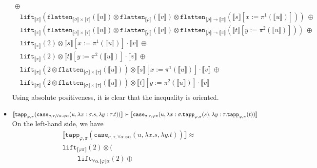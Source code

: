 \documentclass[a4paper,UKenglish,cleveref,autoref,numberwithinsect]{lipics-v2019}
\theoremstyle{definition}
\newcommand{\arrtype}{\rightarrow}
\newcommand{\quant}[2]{\forall #1.#2}
\newcommand{\abs}[2]{\lambda #1.#2}
\newcommand{\flatten}{\mathtt{flatten}}
\newcommand{\lift}{\mathtt{lift}}
\newcommand{\typeinterpret}[1]{\llbracket #1 \rrbracket}
\newcommand{\interpret}[1]{\llbracket #1 \rrbracket}
\begin{document}
\begin{itemize}
\[\begin{array}{l}
    \oplus \\
  \phantom{A}
  \lift_{\typeinterpret{\pi}}(\flatten_{\typeinterpret{\sigma} \times
    \typeinterpret{\tau}}(\interpret{u}) \otimes
    \flatten_{\typeinterpret{\rho}}(\interpret{v}) \otimes
    \flatten_{\typeinterpret{\rho} \arrtype \typeinterpret{\pi}}(
    \interpret{s}[x:=\pi^1(\interpret{u})]))\ \oplus \\
  \phantom{A}
  \lift_{\typeinterpret{\pi}}(\flatten_{\typeinterpret{\sigma} \times
    \typeinterpret{\tau}}(\interpret{u}) \otimes
    \flatten_{\typeinterpret{\rho}}(\interpret{v}) \otimes
    \flatten_{\typeinterpret{\rho} \arrtype \typeinterpret{\pi}}(
    \interpret{t}[y:=\pi^2(\interpret{u})]))\ \oplus \\
  \phantom{A}
  \lift_{\typeinterpret{\pi}}(2) \otimes \interpret{s}[x:=\pi^1(
    \interpret{u})] \cdot \interpret{v}\ \oplus \\
  \phantom{A}
  \lift_{\typeinterpret{\pi}}(2) \otimes \interpret{t}[y:=\pi^2(
    \interpret{u})] \cdot \interpret{v}\ \oplus \\
  \phantom{A}
  \lift_{\typeinterpret{\pi}}(2 \otimes
    \flatten_{\typeinterpret{\sigma} \times
    \typeinterpret{\tau}}(\interpret{u})) \otimes
    \interpret{s}[x:=\pi^1(\interpret{u})] \cdot \interpret{v}\ \oplus\\
  \phantom{A}
  \lift_{\typeinterpret{\pi}}(2 \otimes
    \flatten_{\typeinterpret{\sigma} \times
    \typeinterpret{\tau}}(\interpret{u})) \otimes
    \interpret{t}[y:=\pi^2(\interpret{u})] \cdot \interpret{v} \\
  \end{array}
  \]
  Using absolute positiveness, it is clear that the inequality is
  oriented.
\item $\interpret{\mathtt{tapp}_{\varphi,\pi}(\mathtt{case}_{\sigma,\tau,
  \quant{\alpha}{\varphi\alpha}}(u,\abs{x:\sigma}{s},\abs{y:\tau}{t}))}
  \succ \\ \interpret{\mathtt{case}_{\sigma,\tau,\varphi\pi}(u,
  \abs{x:\sigma}{\mathtt{tapp}_{\varphi,\pi}(s)},
  \abs{y:\tau}{\mathtt{tapp}_{\varphi,\pi}(t)})}$ \\
  On the left-hand side, we have
  \[
  \begin{array}{l}
  \interpret{\mathtt{tapp}_{\varphi,\pi}(\mathtt{case}_{\sigma,\tau,
  \quant{\alpha}{\varphi\alpha}}(u,\abs{x}{s},\abs{y}{t}))} \approx \\
  \lift_{\typeinterpret{\varphi\pi}}(2) \otimes ( \\
    \phantom{ABC}
    \lift_{\quant{\alpha}{\typeinterpret{\varphi}\alpha}}(2) \oplus

\end{array}\]
\end{itemize}
\end{document}
